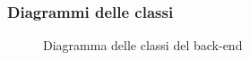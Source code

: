 \subsubsection{Diagrammi delle classi}

\begin{figure}[H]
  \caption{Diagramma delle classi del back-end}
\end{figure}